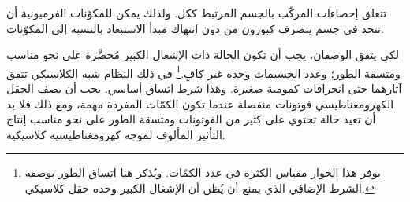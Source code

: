 تتعلق إحصاءات المركّب بالجسم المرتبط ككل. ولذلك يمكن للمكوّنات الفرميونية أن تتحد في جسم يتصرف كبوزون من دون انتهاك مبدأ الاستبعاد بالنسبة إلى المكوّنات.

\begin{classroomqa}
\end{classroomqa}

لكي يتفق الوصفان، يجب أن تكون الحالة ذات الإشغال الكبير مُحضَّرة على نحو مناسب ومتسقة الطور؛ وعدد الجسيمات وحده غير كافٍ.\footnote{يوفر هذا الحوار مقياس الكثرة في عدد الكمّات. ويُذكر هنا اتساق الطور بوصفه الشرط الإضافي الذي يمنع أن يُظن أن الإشغال الكبير وحده حقل كلاسيكي.} في ذلك النظام شبه الكلاسيكي تتفق آثارهما حتى انحرافات كمومية صغيرة. وهذا شرط اتساق أساسي. يجب أن يصف الحقل الكهرومغناطيسي فوتونات منفصلة عندما تكون الكمّات المفردة مهمة، ومع ذلك فلا بد أن تعيد حالة تحتوي على كثير من الفوتونات ومتسقة الطور على نحو مناسب إنتاج التأثير المألوف لموجة كهرومغناطيسية كلاسيكية.